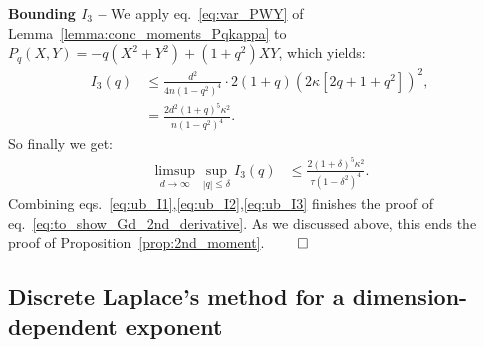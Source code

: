 {\myskip 
\textbf{Bounding $I_3$ --}
We apply eq.~\eqref{eq:var_PWY} of Lemma~\ref{lemma:conc_moments_Pqkappa} to $P_q(X, Y) = - q (X^2+Y^2) + (1+q^2) XY$, which yields:
\begin{align*}
    I_3(q) &\leq \frac{d^2}{4 n (1-q^2)^4} \cdot 2(1+q) \left(2 \kappa [2 q + 1+q^2]\right)^2, \\ 
    &= \frac{2d^2 (1+q)^5 \kappa^2}{n (1-q^2)^4}.
\end{align*}
So finally we get:
\begin{align}\label{eq:ub_I3}
    \limsup_{d \to \infty} \sup_{|q| \leq \delta} I_3(q) &\leq \frac{2(1+\delta)^5 \kappa^2}{\tau (1-\delta^2)^4}.
\end{align}
Combining eqs.~\eqref{eq:ub_I1},\eqref{eq:ub_I2},\eqref{eq:ub_I3} finishes the proof of eq.~\eqref{eq:to_show_Gd_2nd_derivative}. 
As we discussed above, this ends the proof of Proposition~\ref{prop:2nd_moment}.
$\qed$
}

\subsection{Discrete Laplace's method for a dimension-dependent exponent}\label{subsec:proof_laplace_discrete}

